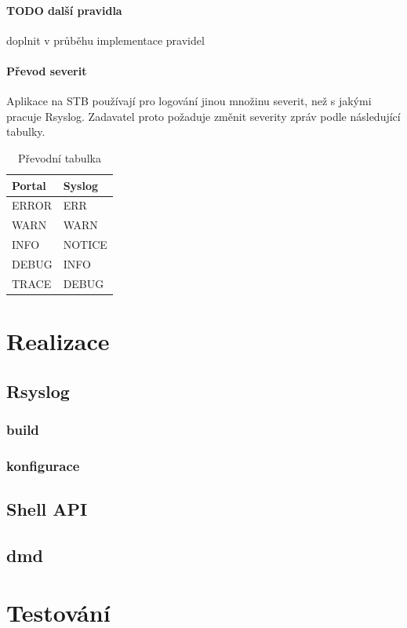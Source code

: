\documentclass[thesis=B,czech]{FITthesis}[2012/06/26]
\begin{document}
\subsubsection{TODO další pravidla}
doplnit v průběhu implementace pravidel

\subsubsection{Převod severit}
Aplikace na STB používají pro logování jinou množinu severit, než s jakými pracuje Rsyslog. Zadavatel proto požaduje změnit severity zpráv podle následující tabulky.

\begin{table}[ht]
\centering
	\caption{Převodní tabulka}	\begin{tabular}{|l|l|}\hline
		Portal		& Syslog			\tabularnewline \hline \hline
		ERROR		& ERR			\tabularnewline \hline
		WARN		& WARN			\tabularnewline \hline
		INFO		& NOTICE			\tabularnewline \hline
		DEBUG		& INFO			\tabularnewline \hline
		TRACE		& DEBUG			\tabularnewline \hline
	\end{tabular}
\end{table}


\chapter{Realizace}

\section{Rsyslog}
\subsection{build}
\subsection{konfigurace}

\section{Shell API}

\section{dmd}

\chapter{Testování}
\end{document}
